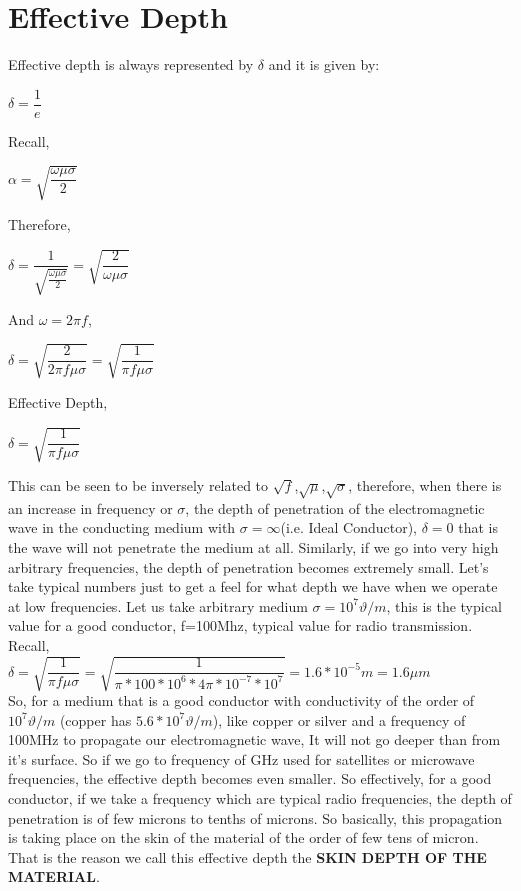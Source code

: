 \section{\textbf{Effective Depth}}

	Effective depth is always represented by $\delta$ and it is given by:
	
		$\delta=\dfrac{1}{e}$
		
		Recall,
		\begin{center}
		$\alpha=\sqrt{\dfrac{\omega\mu\sigma}{2}}$
		\end{center}
	
		Therefore,\\
		\begin{center}
			$\delta=\dfrac{1}{\sqrt{\frac{\omega\mu\sigma}{2}}}=\sqrt{\dfrac{2}{\omega\mu\sigma}}$
		\end{center}
	
		And $\omega=2\pi f$,\\
		\begin{center}
		$\delta=\sqrt{\dfrac{2}{2\pi f\mu\sigma}}=\sqrt{\dfrac{1}{\pi f \mu\sigma}}$	
		\end{center}
		
		Effective Depth, \begin{center}
			$\delta=\sqrt{\dfrac{1}{\pi f \mu\sigma}}$
		\end{center}
		
		This can be seen to be inversely related to $\sqrt{f}$,$\sqrt{\mu}$,$\sqrt{\sigma}$, therefore, when there is an increase in frequency or $\sigma$, the depth of penetration of the electromagnetic wave in the conducting medium with $\sigma=\infty$(i.e. Ideal Conductor), $\delta=0$ that is the wave will not penetrate the medium at all. Similarly, if we go into very high arbitrary frequencies, the depth of penetration becomes extremely small. Let's take typical numbers just to get a feel for what depth we have when we operate at low frequencies.\newline
		Let us take arbitrary medium $\sigma=10^{7}\vartheta/m$, this is the typical value for a good conductor, f=100Mhz, typical value for radio transmission.\newline
		Recall,\\
		
		$\delta=\sqrt{\dfrac{1}{\pi f\mu\sigma}}=\sqrt{\dfrac{1}{\pi*100*10^{6}*4\pi*10^{-7}*10^{7}}}=1.6*10^{-5}m=1.6\mu m$\\
		So, for a medium that is a good conductor with conductivity of the order of  $ 10^{7}\vartheta/m  $ (copper has $ 5.6 * 10^{7}\vartheta/m $), like copper or silver and a frequency of 100MHz to propagate our electromagnetic wave, It will not go deeper than   from it's surface. So if we go to frequency of GHz used for satellites or microwave frequencies, the effective depth becomes even smaller. So effectively, for a good conductor, if we take a frequency which are typical radio frequencies, the depth of penetration is of few microns to tenths of microns. So basically, this propagation is taking place on the skin of the material of the order of few tens of micron. That is the reason we call this effective depth the \textbf{SKIN DEPTH OF THE MATERIAL}.\\
		
